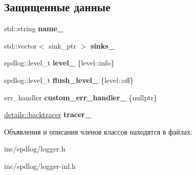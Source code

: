 \subsection*{Защищенные данные}
\begin{DoxyCompactItemize}
\item 
\mbox{\label{classspdlog_1_1logger_a75c1f8d46f532e221eb0ace35fdd0513}} 
std\+::string {\bfseries name\+\_\+}
\item 
\mbox{\label{classspdlog_1_1logger_a24a3b3250f3fe52fa7c3053e77076f07}} 
std\+::vector$<$ sink\+\_\+ptr $>$ {\bfseries sinks\+\_\+}
\item 
\mbox{\label{classspdlog_1_1logger_af167b5b45a369b3cef019b40a87ed71d}} 
spdlog\+::level\+\_\+t {\bfseries level\+\_\+} \{level\+::info\}
\item 
\mbox{\label{classspdlog_1_1logger_a69f7cbb7e1b2d5204a409906a62c1e94}} 
spdlog\+::level\+\_\+t {\bfseries flush\+\_\+level\+\_\+} \{level\+::off\}
\item 
\mbox{\label{classspdlog_1_1logger_a30967665909689412dfdfc856fd6a291}} 
err\+\_\+handler {\bfseries custom\+\_\+err\+\_\+handler\+\_\+} \{nullptr\}
\item 
\mbox{\label{classspdlog_1_1logger_aa1e98497db9dadb18f7f1b5ac22570d1}} 
\hyperlink{classspdlog_1_1details_1_1backtracer}{details\+::backtracer} {\bfseries tracer\+\_\+}
\end{DoxyCompactItemize}


Объявления и описания членов классов находятся в файлах\+:\begin{DoxyCompactItemize}
\item 
inc/spdlog/logger.\+h\item 
inc/spdlog/logger-\/inl.\+h\end{DoxyCompactItemize}
